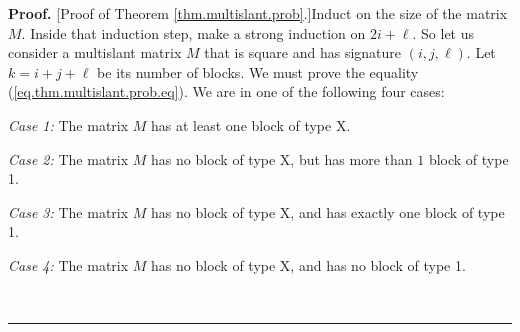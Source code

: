 \documentclass[numbers=enddot,12pt,final,onecolumn,notitlepage]{scrartcl}%
\theoremstyle{definition}
\newenvironment{proof}[1][Proof]{\noindent\textbf{#1.} }{\ \rule{0.5em}{0.5em}}
\theoremstyle{plainsl}
\begin{document}
\begin{proof}
[Proof of Theorem \ref{thm.multislant.prob}.]Induct on the size of the
matrix $M$. Inside that induction step, make a strong induction on $2i+\ell$.
So let us consider a multislant matrix $M$ that is square and has signature
$\left(  i,j,\ell\right)  $. Let $k=i+j+\ell$ be its number of blocks. We must
prove the equality (\ref{eq.thm.multislant.prob.eq}). We are in one of the
following four cases:

\textit{Case 1:} The matrix $M$ has at least one block of type X.

\textit{Case 2:} The matrix $M$ has no block of type X, but has more than $1$
block of type 1.

\textit{Case 3:} The matrix $M$ has no block of type X, and has exactly one
block of type 1.

\textit{Case 4:} The matrix $M$ has no block of type X, and has no block of
type 1.


\end{proof}
\end{document}
